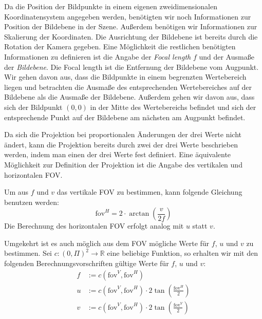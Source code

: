 \documentclass[ngerman,a4paper]{scrartcl}
\def \R{\mathbb{R}}
\def \fov{\mathrm{fov}}
\begin{document}
Da die Position der Bildpunkte in einem eigenen zweidimensionalen Koordinatensystem angegeben werden, benötigten wir noch Informationen zur Position der Bildebene in der Szene. Außerdem benötigen wir Informationen zur Skalierung der Koordinaten. Die Ausrichtung der Bildebene ist bereits durch die Rotation der Kamera gegeben. Eine Möglichkeit die restlichen benötigten Informationen zu definieren ist die Angabe der \emph{Focal length} $f$ und der Ausmaße der \emph{Bildebene}. Die Focal length ist die Entfernung der Bildebene vom Augpunkt. Wir gehen davon aus, dass die Bildpunkte in einem begrenzten Wertebereich liegen und betrachten die Ausmaße des entsprechenden Wertebereiches auf der Bildebene als die Ausmaße der Bildebene. Außerdem gehen wir davon aus, dass sich der Bildpunkt $(0,0)$ in der Mitte des Wertebereichs befindet und sich der entsprechende Punkt auf der Bildebene am nächsten am Augpunkt befindet.

Da sich die Projektion bei proportionalen Änderungen der drei Werte nicht ändert, kann die Projektion bereits durch zwei der drei Werte beschrieben werden, indem man einen der drei Werte fest definiert. Eine äquivalente Möglichkeit zur Definition der Projektion ist die Angabe des vertikalen und horizontalen \ac{FOV}.


Um aus $f$ und $v$ das vertikale \ac{FOV} zu bestimmen, kann folgende Gleichung benutzen werden:
\[ \fov^H = 2 \cdot \arctan \left( \frac{v}{2 f} \right) \]
Die Berechnung des horizontalen \ac{FOV} erfolgt analog mit $u$ statt $v$.

Umgekehrt ist es auch möglich aus dem \ac{FOV} mögliche Werte für $f$, $u$ und $v$ zu bestimmen. Sei $c:(0,\Pi)^2 \to \R$ eine beliebige Funktion, so erhalten wir mit den folgenden Berechnungsvorschriften gültige Werte für $f$, $u$ und $v$:
\begin{align*}
f &:= c(\fov^V,\fov^H)\\
u &:= c(\fov^V,\fov^H) \cdot 2 \tan\left(\frac{\fov^H}{2}\right)\\
v &:= c(\fov^V,\fov^H) \cdot 2 \tan\left(\frac{\fov^V}{2}\right)
\end{align*}
\end{document}

